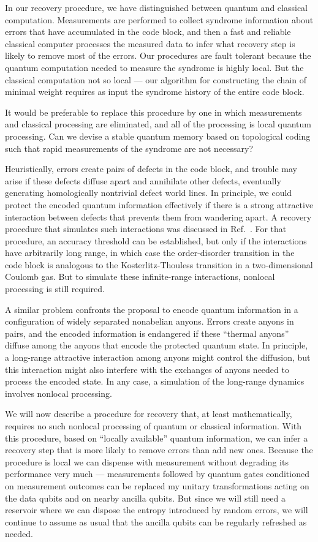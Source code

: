 In our recovery procedure, we have distinguished between quantum and classical
computation.  Measurements are performed to collect syndrome information about
errors that have accumulated in the code block, and then a fast and reliable
classical computer processes the measured data to infer what recovery step is
likely to remove most of the errors.  Our procedures are fault tolerant because the
quantum computation needed to measure the syndrome is
highly local.  But the classical computation not so local --- our algorithm for constructing the chain of minimal weight requires as input the syndrome history of the entire code block. 

It would be preferable to replace this procedure by one in which measurements and classical processing are eliminated, and all of the processing is local quantum processing. Can we devise a stable quantum memory based on topological coding such that rapid measurements of the syndrome are not necessary?

Heuristically, errors create pairs of defects in the code block, and trouble may arise if these defects diffuse apart and annihilate other defects, eventually generating homologically nontrivial defect world lines. In principle, we could protect the encoded quantum information effectively if there is a strong attractive interaction between defects that prevents them from wandering apart. A recovery procedure that simulates such interactions was discussed in Ref.~\cite{dennis}. For that procedure, an accuracy threshold can be established, but only if the interactions have arbitrarily long range, in which case the order-disorder transition in the code block is analogous to the Kosterlitz-Thouless transition in a two-dimensional Coulomb gas. But to simulate these infinite-range interactions, nonlocal processing is still required.

A similar problem confronts the proposal \cite{kitaev2,ogburn,freedman} to encode quantum information in a configuration of widely separated nonabelian anyons. Errors create anyons in pairs, and the encoded information is endangered if these ``thermal anyons'' diffuse among the anyons that encode the protected quantum state. In principle, a long-range attractive interaction among anyons might control the diffusion, but this interaction might also interfere with the exchanges of anyons needed to process the encoded state. In any case, a simulation of the long-range dynamics involves nonlocal processing.

We will now describe a procedure for recovery that, at least mathematically,
requires no such nonlocal processing of quantum or classical information. With
this procedure, based on ``locally available'' quantum information, we can
infer a recovery step that is more likely to remove errors than add new ones.
Because the procedure is local we can dispense
with measurement without degrading its performance very much --- measurements followed by quantum gates conditioned on measurement outcomes can be replaced my unitary transformations acting on the data qubits and on nearby ancilla qubits. But since we
will still need a reservoir where we can dispose the entropy introduced by
random errors, we will continue to assume as usual that the ancilla qubits can be regularly refreshed as needed. 


